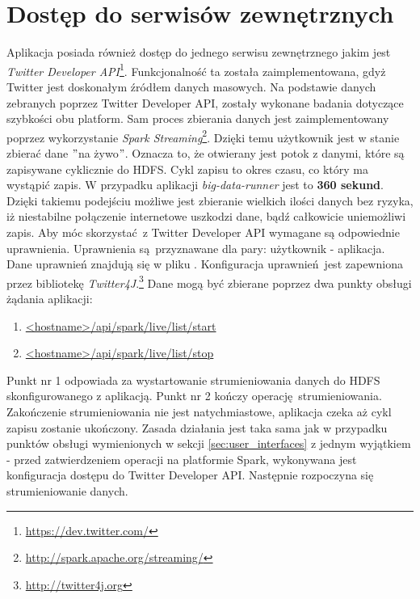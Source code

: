 \section{Dostęp do serwisów zewnętrznych}\label{sec:twitter-api}
Aplikacja posiada również dostęp do jednego serwisu zewnętrznego jakim jest \textit{Twitter Developer API}\footnote{\url{https://dev.twitter.com/}}. Funkcjonalność ta została zaimplementowana, gdyż Twitter jest doskonałym źródłem danych masowych. Na podstawie danych zebranych poprzez Twitter Developer API, zostały wykonane badania dotyczące szybkości obu platform. Sam proces zbierania danych jest zaimplementowany poprzez wykorzystanie \textit{Spark Streaming}\footnote{\url{http://spark.apache.org/streaming/}}. Dzięki temu użytkownik jest w stanie zbierać dane $"$na żywo$"$. Oznacza to, że otwierany jest potok z danymi, które są zapisywane cyklicznie do HDFS. Cykl zapisu to okres czasu, co który ma wystąpić zapis. W przypadku aplikacji \textit{big-data-runner} jest to \textbf{360 sekund}. Dzięki takiemu podejściu możliwe jest zbieranie wielkich ilości danych bez ryzyka, iż niestabilne połączenie internetowe uszkodzi dane, bądź całkowicie uniemożliwi zapis. Aby móc skorzystać z Twitter Developer API wymagane są odpowiednie uprawnienia. Uprawnienia są przyznawane dla pary: użytkownik - aplikacja. Dane uprawnień znajdują się w pliku . Konfiguracja uprawnień jest zapewniona przez bibliotekę \textit{Twitter4J}.\footnote{\url{http://twitter4j.org}}
\newline Dane mogą być zbierane poprzez dwa punkty obsługi żądania aplikacji:
\begin{enumerate}
	\item{\url{<hostname>/api/spark/live/list/start}}
	\item{\url{<hostname>/api/spark/live/list/stop}}
\end{enumerate}
Punkt nr 1 odpowiada za wystartowanie strumieniowania danych do HDFS skonfigurowanego z aplikacją. Punkt nr 2 kończy operację strumieniowania. Zakończenie strumieniowania nie jest natychmiastowe, aplikacja czeka aż cykl zapisu zostanie ukończony. Zasada działania jest taka sama jak w przypadku punktów obsługi wymienionych w sekcji \ref{sec:user_interfaces} z jednym wyjątkiem - przed zatwierdzeniem operacji na platformie Spark, wykonywana jest konfiguracja dostępu do Twitter Developer API. Następnie rozpoczyna się strumieniowanie danych.

